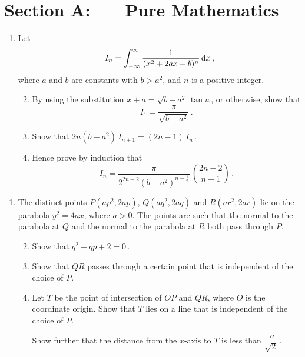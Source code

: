 \documentclass[a4, 11pt]{report}
\newlength{\qspace}
\newcounter{qnumber}
\newenvironment{question}%
 {\vspace{\qspace}
  \begin{enumerate}[\bfseries 1\quad][10]%
    \setcounter{enumi}{\value{qnumber}}%
    \item%
 }
{
  \end{enumerate}
  \filbreak
  \stepcounter{qnumber}
 }
\newenvironment{questionparts}[1][1]%
 {
  \begin{enumerate}[\bfseries (i)]%
    \setcounter{enumii}{#1}
    \addtocounter{enumii}{-1}
    \setlength{\itemsep}{5mm}
    \setlength{\parskip}{8pt}
 }
 {
  \end{enumerate}
 }
\def\d{{\rm d}}
\begin{document}
\setcounter{page}{2}




\section*{Section A: \ \ \ Pure Mathematics}


\begin{question}
Let
\[
\displaystyle
I_n=
 \int_{-\infty}^\infty
\frac 1 {(x^2+2ax+b)^n}
\, \d x
\,,
\]
 where $a$ and $b$ are constants with $b > a^2$, and $n$ is a positive
integer.
\begin{questionparts}
\item
 By using the substitution $x + a = \sqrt{b-   a^2} \, \tan u\,$,
 or otherwise,
  show that 
\[
I_1 = \dfrac \pi {\sqrt{b-a^2}}\, .
\] 
\item  Show that $2n(b - a^2)\, I_{n+1} =(2n - 1) \, I_n\,$.
\item   Hence prove by induction that 
\[
I_n =
 \frac{\pi}{2^{2n-2}( b - a^2)^{n-\frac12}} 
\, \binom {2n\! - \!2}{n\!-\!1}
\,.
\]
\end{questionparts}
\end{question}

\begin{question}
 The distinct points $P(ap^2 , 2ap)$,  $Q(aq^2 , 2aq)$ and $R(ar^2,2ar)$
 lie on the parabola  $y^2 = 4ax$, where $a>0$.
The points are such that the normal to the parabola at $Q$ and 
the normal to the parabola at $R$ both pass through $P$.


\begin{questionparts}
\item Show that $q^2 +qp + 2 = 0$\,.
\item 
 Show that 
$QR$ passes through a certain point that is independent of the 
choice of $P$.
\item
Let $T$ be
the point of intersection of  $OP$ and $QR$, where
$O$ is the coordinate origin. Show that $T$
 lies on a line that is independent of the choice of $P$. 

Show further 
that the distance  from the $x$-axis to $T$ is less
than $\dfrac {\;a}{\sqrt2}\,$.
\end{questionparts}

\end{question} 
\end{document}

